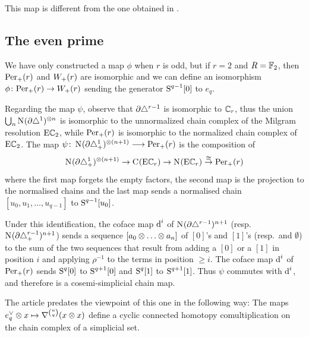 This map is different from the one obtained in \cite[Prop.~6.16]{brumfiel2023explicit}.



\subsection{The even prime}\label{ss:even} We have only constructed a map $\phi$ when $r$ is odd, but if $r= 2$ and $R=\mathbb{F}_2$, then $\mathrm{Per}_+(r)$ and $W_+(r)$ are isomorphic and we can define an isomorphism $\phi\colon \mathrm{Per}_+(r)\to W_+(r)$ sending the generator $\operatorname{S}^{q-1}[0]$ to $e_q$.

Regarding the map $\psi$, observe that $\partial \triangle^{r-1}$ is isomorphic to $\mathbb{C}_r$, thus the union $\bigcup_n \operatorname{N}_{}(\partial \triangle^1)^{\otimes n}$ is isomorphic to the unnormalized chain complex of the Milgram resolution $\mathrm{E}\mathbb{C}_2$, while $\mathrm{Per}_+(r)$ is isomorphic to the normalized chain complex of $\mathrm{E}\mathbb{C}_2$. The map $\psi\colon \operatorname{N}_{}(\partial \triangle_{+}^1)^{\otimes (n+1)} \longrightarrow \mathrm{Per}_+(r)$ is the composition of
\[
	\operatorname{N}_{}(\partial \triangle_{+}^1)^{\otimes (n+1)}
	\to
	\operatorname{C}_{}(\mathrm{E}\mathbb{C}_r)
	\to
	\operatorname{N}_{}(\mathrm{E}\mathbb{C}_r)
	\overset{\cong}{\to}
	\mathrm{Per}_+(r)
\] 
where the first map forgets the empty factors, the second map is the projection to the normalised chains and the last map sends a normalised chain $[u_0,u_1,\ldots,u_{q-1}]$ to $\operatorname{S}^{q-1}[u_0]$. 

Under this identification, the coface map $\operatorname{d}^i$ of $\operatorname{N}_{}(\partial\triangle^{r-1})^{n+1}$ (resp.\ $\operatorname{N}_{}(\partial\triangle_{+}^{r-1})^{n+1}$) sends a sequence $[a_0\otimes \ldots\otimes a_n]$ of $[0]$'s and $[1]$'s (resp.\ and $\emptyset$) to the sum of the two sequences that result from adding a $[0]$ or a $[1]$ in position $i$ and applying $\rho^{-1}$ to the terms in position $\geq i$. The coface map $\operatorname{d}^i$ of $\mathrm{Per}_+(r)$ sends $\operatorname{S}^{q}[0]$ to $\operatorname{S}^{q+1}[0]$ and $\operatorname{S}^{q}[1]$ to $\operatorname{S}^{q+1}[1]$. Thus $\psi$ commutes with $\operatorname{d}^i$, and therefore is a cosemi-simplicial chain map.
\begin{remark}
	The article \cite{medina2021fast_sq} predates the viewpoint of this one in the following way: The maps $e_q^\vee\otimes x \mapsto \nabla^{\binom{n}{q}}(x\otimes x)$ define a cyclic connected homotopy comultiplication on the chain complex of a simplicial set. 
\end{remark}

